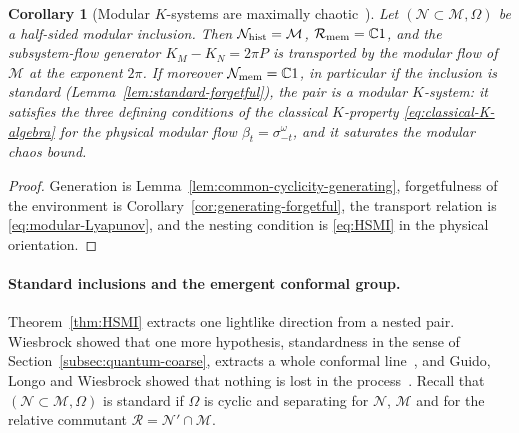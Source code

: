 \documentclass[a4paper,11pt]{article}
\newtheorem{corollary}[theorem]{Corollary}
\theoremstyle{definition}
\begin{document}
\begin{corollary}[Modular $K$-systems are maximally chaotic~{\cite{OFLLM2024}}]\label{cor:maximal-chaos-K-system}
Let $(\mathcal N\subset\mathcal M,\Omega)$ be a half-sided modular inclusion. Then $\mathcal N_{\rm hist}=\mathcal M$, $\mathcal R_{\rm mem}=\mathbb C1$, and the subsystem-flow generator $K_M-K_N=2\pi P$ is transported by the modular flow of $\mathcal M$ at the exponent $2\pi$. If moreover $\mathcal N_{\rm mem}=\mathbb C1$, in particular if the inclusion is standard (Lemma~\ref{lem:standard-forgetful}), the pair is a modular $K$-system: it satisfies the three defining conditions of the classical $K$-property \eqref{eq:classical-K-algebra} for the physical modular flow $\beta_t=\sigma^\omega_{-t}$, and it saturates the modular chaos bound.
\end{corollary}
\begin{proof}
Generation is Lemma~\ref{lem:common-cyclicity-generating}, forgetfulness of the environment is Corollary~\ref{cor:generating-forgetful}, the transport relation is \eqref{eq:modular-Lyapunov}, and the nesting condition is \eqref{eq:HSMI} in the physical orientation.
\end{proof}

\paragraph{Standard inclusions and the emergent conformal group.}
Theorem~\ref{thm:HSMI} extracts one lightlike direction from a nested pair. Wiesbrock showed that one more hypothesis, standardness in the sense of Section~\ref{subsec:quantum-coarse}, extracts a whole conformal line~\cite{Wiesbrock1993b}, and Guido, Longo and Wiesbrock showed that nothing is lost in the process~\cite{GuidoLongoWiesbrock1998}. Recall that $(\mathcal N\subset\mathcal M,\Omega)$ is standard if $\Omega$ is cyclic and separating for $\mathcal N$, $\mathcal M$ and for the relative commutant $\mathcal R=\mathcal N'\cap\mathcal M$.
\end{document}
